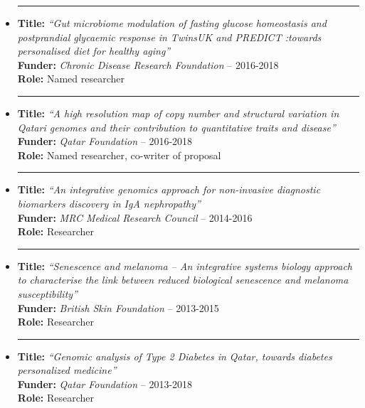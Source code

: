\documentclass[a4paper,10pt]{article}
\newcommand{\noitem}{\item[]}
\begin{document}
\begin{itemize}[leftmargin=*,itemsep=1.2ex]
	\noitem\rule{1mm}{0pt}  \begin{minipage}[t]{0.94\textwidth}
		\textbf{Title:} \emph{``Gut microbiome modulation of fasting glucose homeostasis and postprandial glycaemic response in TwinsUK and PREDICT :towards personalised diet for healthy aging''}\\
		\textbf{Funder:} \emph{Chronic Disease Research Foundation} -- 2016-2018\\
		\textbf{Role:} Named researcher
	\end{minipage}
	
	\noitem\rule{1mm}{0pt}  \begin{minipage}[t]{0.94\textwidth}
		\textbf{Title:} \emph{``A high resolution map of copy number and structural variation in Qatari genomes and their contribution to quantitative traits and disease''}\\
		\textbf{Funder:} \emph{Qatar Foundation} -- 2016-2018\\
		\textbf{Role:} Named researcher, co-writer of proposal
	\end{minipage}
	
	\noitem\rule{1mm}{0pt}  \begin{minipage}[t]{0.94\textwidth}
		\textbf{Title:} \emph{``An integrative genomics approach for non-invasive diagnostic biomarkers discovery in IgA nephropathy''}\\
		\textbf{Funder:} \emph{MRC Medical Research Council} -- 2014-2016\\
		\textbf{Role:} Researcher
	\end{minipage}
	
	\noitem\rule{1mm}{0pt}  \begin{minipage}[t]{0.94\textwidth}
		\textbf{Title:} \emph{``Senescence and melanoma -- An integrative systems biology approach to characterise the link between reduced biological senescence and melanoma susceptibility''}\\
		\textbf{Funder:} \emph{British Skin Foundation} -- 2013-2015\\
		\textbf{Role:} Researcher
	\end{minipage}
		
	\noitem\rule{1mm}{0pt}  \begin{minipage}[t]{0.94\textwidth}
		\textbf{Title:} \emph{``Genomic analysis of Type 2 Diabetes in Qatar, towards diabetes personalized medicine''}\\
		\textbf{Funder:} \emph{Qatar Foundation} -- 2013-2018\\
		\textbf{Role:} Researcher
	\end{minipage}
	

\end{itemize}
\end{document}

